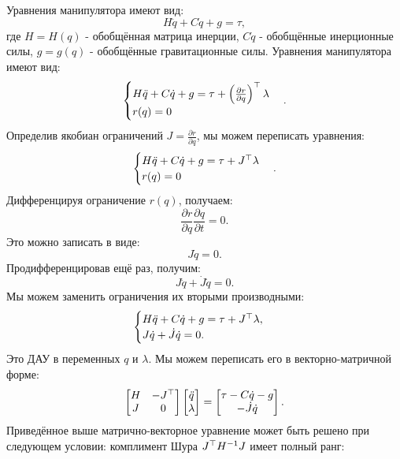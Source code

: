 Уравнения манипулятора имеют вид:
%
\begin{equation}
	{H} \ddot{{q}} + {C} \dot{{q}} + {g} = \tau,
\end{equation}
%
где ${H}={H}({q})$ - обобщённая матрица инерции, ${C}\dot{{q}}$ - обобщённые инерционные силы, ${g}={g}({q})$ - обобщённые гравитационные силы.
Уравнения манипулятора имеют вид:
%
\begin{equation}
	\begin{cases}
		{H} \ddot{{q}} + {C} \dot{{q}} + {g} = \tau + \left( \frac{\partial {r}}{\partial {q}} \right)^\top \lambda
		\\
		{r}({q}) = 0
	\end{cases}.
\end{equation}
%
Определив якобиан ограничений ${J} = \frac{\partial {r}}{\partial {q}}$, мы можем переписать уравнения:
%
\begin{equation}
	\begin{cases}
		{H} \ddot{{q}} + {C} \dot{{q}} + {g} = \tau + {J}^\top \lambda
		\\
		{r}({q}) = 0
	\end{cases}.
\end{equation}
Дифференцируя ограничение ${r}({q})$, получаем:
%
\begin{equation}
	\frac{\partial {r}}{\partial {q}} \frac{\partial {q}}{\partial t} = 0.
\end{equation}
%
Это можно записать в виде:
%
\begin{equation}
	{J} \dot{{q}} = 0.
\end{equation}
%
Продифференцировав ещё раз, получим:
%
\begin{equation}
	{J} \ddot{{q}} + \dot{{J}} \dot{{q}} = 0.
\end{equation}
%
Мы можем заменить ограничения их вторыми производными:
%
\begin{equation}
	\begin{cases}
		{H} \ddot{{q}} + {C} \dot{{q}} + {g} = \tau + {J}^\top \lambda,
		\\
		{J} \dot{{q}} + \dot{{J}} \dot{{q}} = 0.
	\end{cases}
\end{equation}
%
Это ДАУ в переменных ${q}$ и $\lambda$. Мы можем переписать его в векторно-матричной форме:
%
\begin{equation}
	\begin{bmatrix}
		{H} & -{J}^\top \\
		{J} & 0
	\end{bmatrix}
	\begin{bmatrix}
		\ddot{{q}} \\
		\lambda
	\end{bmatrix}
	=
	\begin{bmatrix}
		\tau - {C} \dot{{q}} - {g} \\
		-\dot{{J}} \dot{{q}}
	\end{bmatrix}.
\end{equation}
Приведённое выше матрично-векторное уравнение может быть решено при следующем условии: комплимент Шура ${J}^\top {H}^{-1}{J}$ имеет полный ранг:

